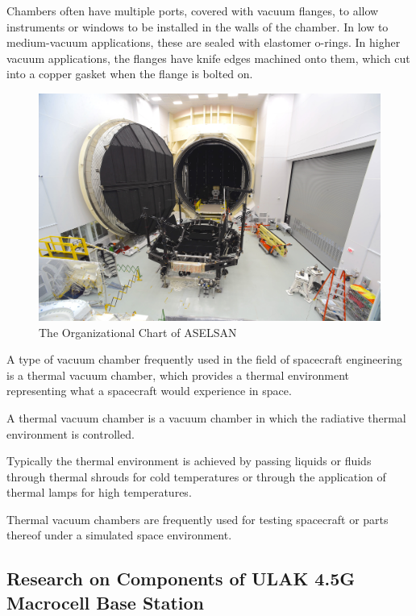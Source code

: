Chambers often have multiple ports, covered with vacuum flanges, to allow instruments or windows to be installed in the walls of the chamber. In low to medium-vacuum applications, these are sealed with elastomer o-rings. In higher vacuum applications, the flanges have knife edges machined onto them, which cut into a copper gasket when the flange is bolted on.

\begin{figure}[H]
	\center
	\setlength{\unitlength}{\textwidth} 
	\includegraphics[width=1.0\unitlength]{tvac}
	\caption{\label{fig:tvac}The Organizational Chart of ASELSAN }
\end{figure}

A type of vacuum chamber frequently used in the field of spacecraft engineering is a thermal vacuum chamber, which provides a thermal environment representing what a spacecraft would experience in space.

	A thermal vacuum chamber is a vacuum chamber in which the radiative thermal environment is controlled.

Typically the thermal environment is achieved by passing liquids or fluids through thermal shrouds for cold temperatures or through the application of thermal lamps for high temperatures.

Thermal vacuum chambers are frequently used for testing spacecraft or parts thereof under a simulated space environment.

\subsection{Research on Components of ULAK 4.5G Macrocell Base Station  }

